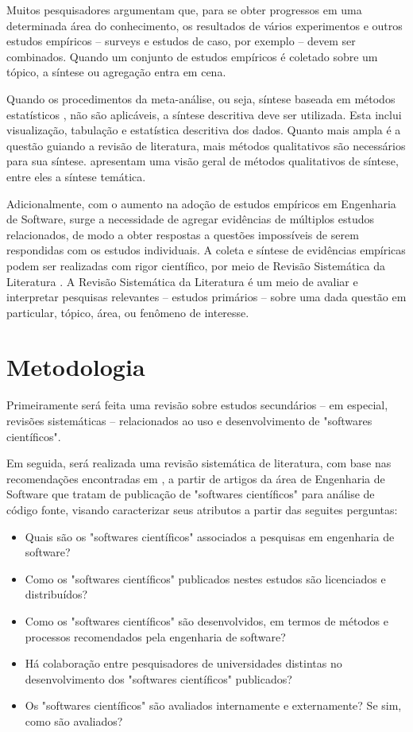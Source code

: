 \documentclass[12pt]{article}
\begin{document}
Muitos pesquisadores argumentam que, para se obter progressos em uma
determinada área do conhecimento, os resultados de vários experimentos e
outros estudos empíricos -- surveys e estudos de caso, por exemplo -- devem
ser combinados. Quando um conjunto de estudos empíricos é coletado sobre um
tópico, a síntese ou agregação entra em cena.

Quando os procedimentos da meta-análise, ou seja, síntese baseada em métodos
estatísticos \cite{Almqvist2006}, não são aplicáveis, a síntese descritiva
deve ser utilizada. Esta inclui visualização, tabulação e estatística
descritiva dos dados. Quanto mais ampla é a questão guiando a revisão de
literatura, mais métodos qualitativos são necessários para sua síntese.
 apresentam uma visão geral de métodos qualitativos de
síntese, entre eles a síntese temática.

Adicionalmente, com o aumento na adoção de estudos empíricos em Engenharia de
Software, surge a necessidade de agregar evidências de múltiplos estudos
relacionados, de modo a obter respostas a questões impossíveis de serem
respondidas com os estudos individuais. A coleta e síntese de evidências
empíricas podem ser realizadas com rigor científico, por meio de Revisão
Sistemática da Literatura \cite{Kitchenham2007}. A Revisão Sistemática da
Literatura  é um meio de avaliar e interpretar pesquisas relevantes -- estudos
primários -- sobre uma dada questão em particular, tópico, área, ou fenômeno
de interesse.

\section{Metodologia}

Primeiramente será feita uma revisão sobre estudos secundários -- em especial,
revisões sistemáticas -- relacionados ao uso e desenvolvimento de "softwares
científicos".

Em seguida, será realizada uma revisão sistemática de literatura, com base nas
recomendações encontradas em \cite{Kitchenham2007}, a partir de artigos da
área de Engenharia de Software que tratam de publicação de "softwares
científicos" para análise de código fonte, visando caracterizar seus atributos
a partir das seguites perguntas:

\begin{itemize}
  \item Quais são os "softwares científicos" associados a pesquisas em
    engenharia de software?
  \item Como os "softwares científicos" publicados nestes estudos são
    licenciados e distribuídos?
  \item Como os "softwares científicos" são desenvolvidos, em termos de
    métodos e processos recomendados pela engenharia de software?
  \item Há colaboração entre pesquisadores de universidades distintas no
    desenvolvimento dos "softwares científicos" publicados?
  \item Os "softwares científicos" são avaliados internamente e externamente?
    Se sim, como são avaliados?
\end{itemize}
\end{document}
